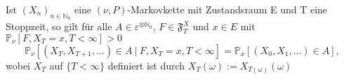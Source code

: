 \label{starke Markoveigenschaft}
Ist $(X_{n})_{n \in \mathbb{N}_{0}}$ eine $(\nu,P)$-Markovkette mit Zustandsraum E und T eine Stoppzeit, so gilt für alle $A \in \varepsilon^{ \otimes \mathbb{N}_{0}}$, $F \in \mathfrak{F}_{T}^{X}$ und $x \in E$ mit $\mathbb{P}_{\nu}[F,X_{T} = x, T < \infty] > 0$
\begin{equation*}
\mathbb{P}_{\nu}[(X_{T},X_{T+1},...) \in A \: | \: F, X_{T} = x, T < \infty] = \mathbb{P}_{x}[(X_{0},X_{1},...) \in A],
\end{equation*}
wobei $X_{T}$ auf $\lbrace T < \infty \rbrace$ definiert ist durch $X_{T}(\omega) := X_{T(\omega)}(\omega)$